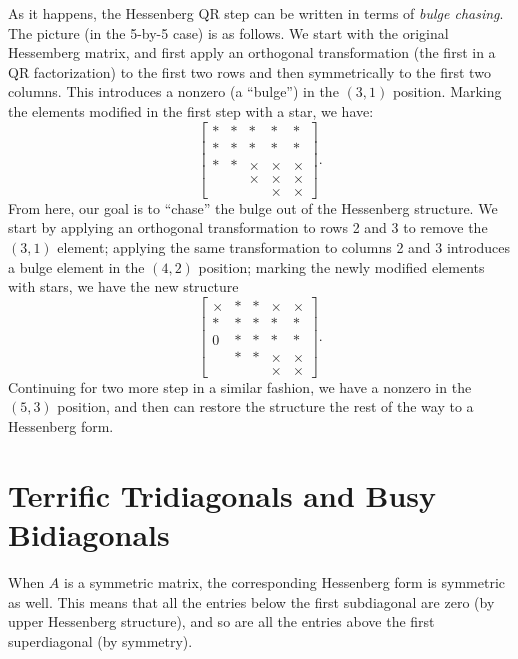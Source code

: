 \documentclass[12pt, leqno]{article}
\begin{document}
As it happens, the Hessenberg QR step can be written in terms of {\em
  bulge chasing}.  The picture (in the 5-by-5 case) is as follows.  We
start with the original Hessemberg matrix, and first apply an
orthogonal transformation (the first in a QR factorization) to the
first two rows and then symmetrically to the first two columns.  This
introduces a nonzero (a ``bulge'') in the $(3,1)$ position.  Marking
the elements modified in the first step with a star, we have:
\[
  \begin{bmatrix}
    * & * & * & * & * \\
    * & * & * & * & * \\
    * & * & \times & \times & \times \\
           &        & \times & \times & \times \\
           &        &        & \times & \times
  \end{bmatrix}.
\]
From here, our goal is to ``chase'' the bulge out of the Hessenberg
structure.  We start by applying an orthogonal transformation to rows
2 and 3 to remove the $(3,1)$ element; applying the same
transformation to columns 2 and 3 introduces a bulge element in the
$(4,2)$ position; marking the newly modified elements with stars,
we have the new structure
\[
  \begin{bmatrix}
    \times & * & * & \times & \times \\
    * & * & * & * & * \\
    0 & * & * & * & * \\
           & * & * & \times & \times \\
           &        &        & \times & \times
  \end{bmatrix}.
\]
Continuing for two more step in a similar fashion, we have a nonzero
in the $(5,3)$ position, and then can restore the structure the rest
of the way to a Hessenberg form.

\section{Terrific Tridiagonals and Busy Bidiagonals}

When $A$ is a symmetric matrix, the corresponding Hessenberg form
is symmetric as well.  This means that all the entries
below the first subdiagonal are zero (by upper Hessenberg structure),
and so are all the entries above the first superdiagonal (by
symmetry).
\end{document}

